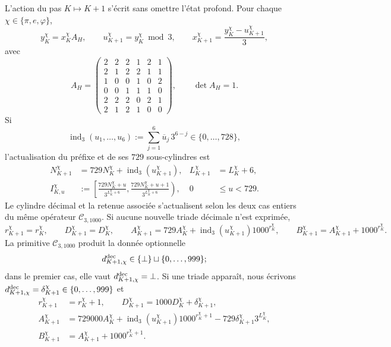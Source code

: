 L'action du pas \(K\mapsto K+1\) s'écrit sans omettre l'état profond. Pour chaque \(\chi\in\{\pi,e,\varphi\}\),
\begin{equation}
\label{eq:continuo-comun-update-hensel-tpk}
 y_K^\chi=x_K^\chi A_H,\qquad
 u_{K+1}^\chi=y_K^\chi\bmod3,\qquad
 x_{K+1}^\chi=\frac{y_K^\chi-u_{K+1}^\chi}{3},
\end{equation}
avec
\[
 A_H=
 \begin{pmatrix}
 2&2&2&1&2&1\\
 2&1&2&2&1&1\\
 1&0&0&1&0&2\\
 0&0&1&1&1&0\\
 2&2&2&0&2&1\\
 2&1&2&1&0&0
 \end{pmatrix},
 \qquad \det A_H=1.
\]
Si
\[
 \operatorname{ind}_3(u_1,\ldots,u_6)
 :=\sum_{j=1}^{6}\overline u_j\,3^{6-j}
 \in\{0,\ldots,728\},
\]
l'actualisation du préfixe et de ses \(729\) sous-cylindres est
\begin{align}
 N_{K+1}^\chi
 &=729N_K^\chi+\operatorname{ind}_3(u_{K+1}^\chi),
 &L_{K+1}^\chi&=L_K^\chi+6,
 \label{eq:continuo-comun-update-cilindro-indice}\\
 I_{K,u}^\chi
 &:=
 \left[
  \frac{729N_K^\chi+u}{3^{L_K^\chi+6}},
  \frac{729N_K^\chi+u+1}{3^{L_K^\chi+6}}
 \right),
 &0&\leq u<729.
 \label{eq:continuo-comun-update-cilindro-intervalo}
\end{align}
Le cylindre décimal et la retenue associée s'actualisent selon les deux cas entiers du même opérateur \(\mathcal C_{3,1000}\). Si aucune nouvelle triade décimale n'est exprimée,
\begin{equation}
\label{eq:continuo-comun-update-cilindro-sin-triada}
 r_{K+1}^\chi=r_K^\chi,\qquad D_{K+1}^\chi=D_K^\chi,\qquad
 A_{K+1}^\chi=729A_K^\chi+
 \operatorname{ind}_3(u_{K+1}^\chi)1000^{r_K^\chi},\qquad
 B_{K+1}^\chi=A_{K+1}^\chi+1000^{r_K^\chi}.
\end{equation}
La primitive \(\mathcal C_{3,1000}\) produit la donnée optionnelle
\[
 d_{K+1,\chi}^{\rm dec}\in
 \{\bot\}\sqcup\{0,\ldots,999\};
\]
dans le premier cas, elle vaut \(d_{K+1,\chi}^{\rm dec}=\bot\). Si une triade apparaît, nous écrivons \(d_{K+1,\chi}^{\rm dec}=\delta_{K+1}^\chi\in\{0,\ldots,999\}\) et
\begin{equation}
\label{eq:continuo-comun-update-cilindro-con-triada}
 \begin{aligned}
 r_{K+1}^\chi&=r_K^\chi+1,\qquad
 D_{K+1}^\chi=1000D_K^\chi+\delta_{K+1}^\chi,\\
 A_{K+1}^\chi&=729000A_K^\chi
 +\operatorname{ind}_3(u_{K+1}^\chi)1000^{r_K^\chi+1}
 -729\delta_{K+1}^\chi3^{L_K^\chi},\\
 B_{K+1}^\chi&=A_{K+1}^\chi+1000^{r_K^\chi+1}.
 \end{aligned}
\end{equation}

